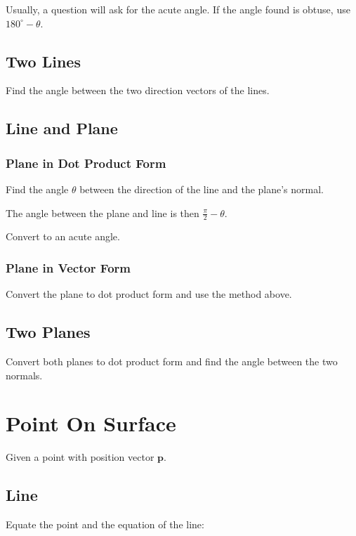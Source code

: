 \documentclass[a4paper,11pt]{article}
\newcommand{\bb}{\boldsymbol}
\begin{document}
Usually, a question will ask for the acute angle. If the angle found is obtuse,
use $180^\circ - \theta$.


\subsection{Two Lines}

Find the angle between the two direction vectors of the lines.


\subsection{Line and Plane}

\subsubsection{Plane in Dot Product Form}

Find the angle $\theta$ between the direction of the line and the plane's normal.

The angle between the plane and line is then $\frac{\pi}{2} - \theta$.

Convert to an acute angle.


\subsubsection{Plane in Vector Form}

Convert the plane to dot product form and use the method above.


\subsection{Two Planes}

Convert both planes to dot product form and find the angle between the two
normals.



\section{Point On Surface}

Given a point with position vector $\bb{p}$.


\subsection{Line}

Equate the point and the equation of the line:
\end{document}
